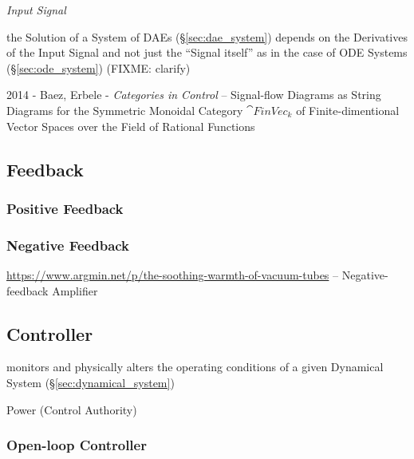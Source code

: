\emph{Input Signal}

\fist the Solution of a System of DAEs (\S\ref{sec:dae_system}) depends on
the Derivatives of the Input Signal and not just the ``Signal itself'' as in
the case of ODE Systems (\S\ref{sec:ode_system})
(FIXME: clarify)

2014 - Baez, Erbele - \emph{Categories in Control} -- Signal-flow Diagrams as
String Diagrams for the Symmetric Monoidal Category $\cat{FinVec}_k$ of
Finite-dimentional Vector Spaces over the Field of Rational Functions



\subsection{Feedback}\label{sec:feedback}

\subsubsection{Positive Feedback}\label{sec:positive_feedback}

\subsubsection{Negative Feedback}\label{sec:negative_feedback}

\url{https://www.argmin.net/p/the-soothing-warmth-of-vacuum-tubes} --
Negative-feedback Amplifier



\subsection{Controller}\label{sec:controller}


monitors and physically alters the operating conditions of a given
Dynamical System (\S\ref{sec:dynamical_system})

Power (Control Authority)



\subsubsection{Open-loop Controller}\label{sec:open_loop}

